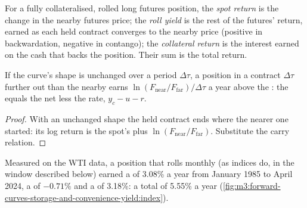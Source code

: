 \begin{definition}\label{def:m3:forward-curves-storage-and-convenience-yield:roll}
For a fully collateralised, rolled long futures position, the \emph{spot return}
is the change in the nearby futures price; the \emph{roll yield} is the rest of the
futures' return, earned as each held contract converges to the nearby price (positive in
backwardation, negative in contango); the \emph{collateral return} is the
interest earned on the cash that backs the position. Their sum is the total return.
\end{definition}

\begin{proposition}\label{prop:m3:forward-curves-storage-and-convenience-yield:rolly}
If the curve's shape is unchanged over a period $\Delta\tau$, a position in a contract $\Delta\tau$
further out than the nearby earns $\ln(F_{\mathrm{near}}/F_{\mathrm{far}})/\Delta\tau$ a year above the
: the  equals the net  less the rate,
$y_c - u - r$.
\end{proposition}

\begin{proof}
With an unchanged shape the held contract ends where the nearer one started: its log return is the
spot's plus $\ln(F_{\mathrm{near}}/F_{\mathrm{far}})$. Substitute the carry relation.
\end{proof}

Measured on the WTI data, a position that rolls monthly (as indices do, in the window described
below) earned a  of 3.08\% a year from January 1985 to April 2024, a  of $-0.71\%$
and a  of 3.18\%: a total of 5.55\% a year
(\cref{fig:m3:forward-curves-storage-and-convenience-yield:index}).

